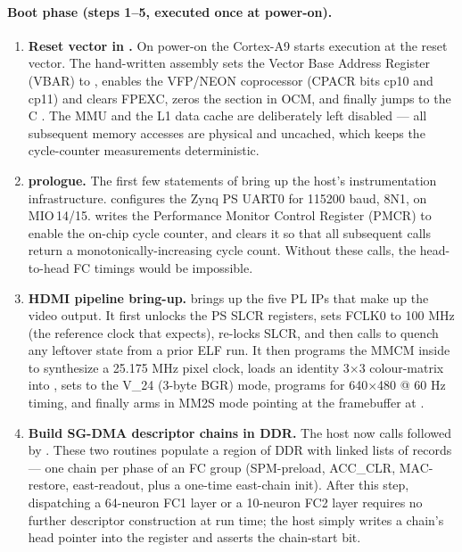 \paragraph{Boot phase (steps 1--5, executed once at power-on).}
\begin{enumerate}[leftmargin=2.1em, label=\textbf{Step \arabic*.},
                  itemsep=4pt, topsep=2pt]
\item \textbf{Reset vector in .} On power-on the
Cortex-A9 starts execution at the reset vector. The hand-written
assembly sets the Vector Base Address Register (VBAR) to
, enables the VFP/NEON coprocessor (CPACR bits cp10
and cp11) and clears FPEXC, zeros the  section in OCM,
and finally jumps to the C . The MMU and the L1 data
cache are deliberately left disabled --- all subsequent memory
accesses are physical and uncached, which keeps the cycle-counter
measurements deterministic.

\item \textbf{ prologue.} The first few statements of
 bring up the host's instrumentation infrastructure.
 configures the Zynq PS UART0 for 115200 baud, 8N1,
on MIO\,14/15.  writes the Performance
Monitor Control Register (PMCR) to enable the on-chip cycle counter,
and  clears it so that all subsequent
 calls return a monotonically-increasing
cycle count. Without these calls, the head-to-head FC timings would
be impossible.

\item \textbf{HDMI pipeline bring-up.}  brings up
the five PL IPs that make up the video output. It first unlocks the
PS SLCR registers, sets FCLK0 to 100 MHz (the reference clock that
 expects), re-locks SLCR, and then calls
 to quench any leftover state from a prior
ELF run. It then programs the MMCM inside  to
synthesize a 25.175 MHz pixel clock, loads an identity 3$\times$3
colour-matrix into , sets 
to the V\_24 (3-byte BGR) mode, programs  for 640$\times$480
@ 60 Hz timing, and finally arms  in MM2S mode
pointing at the framebuffer at .

\item \textbf{Build SG-DMA descriptor chains in DDR.} The host now
calls  followed by
. These two routines populate a
region of DDR with linked lists of 
records --- one chain per phase of an FC group (SPM-preload, ACC\_CLR,
MAC-restore, east-readout, plus a one-time east-chain init). After
this step, dispatching a 64-neuron FC1 layer or a 10-neuron FC2
layer requires no further descriptor construction at run time; the
host simply writes a chain's head pointer into the
 register and asserts the chain-start bit.


\end{enumerate}
